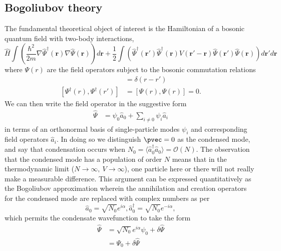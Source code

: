 	\subsection*{Bogoliubov theory}
	The fundamental theoretical object of interest is the Hamiltonian of a bosonic quantum field with two-body interactions,
	\begin{equation}
		\hat{H} \int\left(\frac{\hbar^2}{2m}\nabla\hat{\Psi}^\dagger(\textbf{r})\nabla\hat{\Psi}(\textbf{r})\right)d\textbf{r} + \frac{1}{2}\int\left(\hat{\Psi}^\dagger(\textbf{r}')\hat{\Psi}^\dagger(\textbf{r})V(\textbf{r}'-\textbf{r}) \hat{\Psi}(\textbf{r}')\hat{\Psi}(\textbf{r})\right)d\textbf{r}'d\textbf{r}
		\label{eqn:ham}
	\end{equation}
	where $\Psi(r)$ are the field operators subject to the bosonic commutation relations
	\begin{align}
		[\Psi(r),\Psi^\dagger(r')] &= \delta(r-r')\\
		 [\Psi^\dagger(r),\Psi^\dagger(r')]&=[\Psi(r),\Psi(r)]=0.
	\end{align}	
	We can then write the field operator in the suggestive form	
	\begin{align}
		\hat{\Psi} &= \psi_0 \hat{a}_0 + \sum_{i\neq0}\psi_i \hat{a}_i
	\end{align}
	in terms of an orthonormal basis of single-particle modes $\psi_i$ and corresponding field operators $\hat{a}_i$.
	In doing so we distinguish $\pvec=0$ as the condensed mode, and say that condensation occurs when $N_0=\langle\hat{a}^\dagger_0\hat{a}_0\rangle =\mathcal{O}(N)$.
	The observation that the condensed mode has a population of order $N$ means that in the thermodynamic limit ($N\rightarrow\infty,~V\rightarrow\infty$), one particle here or there will not really make a measurable difference.
	This argument can be expressed quantitatively as the Bogoliubov approximation wherein the annihilation and creation operators for the condensed mode are replaced with complex numbers as per
	\begin{equation}
		\hat{a}_0 = \sqrt{N_0}e^{i\alpha}, \hat{a}_0^\dagger= \sqrt{N_0}e^{-i\alpha}, 
	\end{equation}
	which permits the condensate wavefunction to take the form
	\begin{align}
		\hat{\Psi} &= \sqrt{N_0}e^{i\alpha} \psi_0 + \delta\hat{\Psi}\\
					&= \Psi_0 + \delta\hat{\Psi}
	\end{align}


